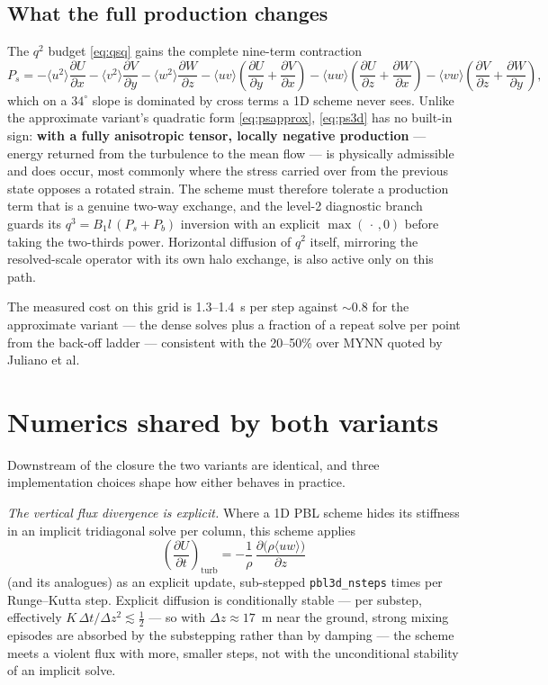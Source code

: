 \documentclass[10pt,a4paper]{article}
\newcommand{\keytag}[1]{\colorbox{keyc}{\textcolor{white}{\sffamily\bfseries\scriptsize K#1}}}
\newcommand{\key}[1]{\marginpar[\raggedleft\keytag{#1}]{\raggedright\keytag{#1}}\ignorespaces}
\newcommand{\kh}[1]{{\color{keyc!80!black}\bfseries #1}}
\newcommand{\avg}[1]{\langle #1 \rangle}
\newcommand{\pd}[2]{\frac{\partial #1}{\partial #2}}
\begin{document}
\subsection{What the full production changes}

The $q^2$ budget \eqref{eq:qsq} gains the complete nine-term contraction
\begin{equation}
P_s = -\avg{u^2}\pd{U}{x} - \avg{v^2}\pd{V}{y} - \avg{w^2}\pd{W}{z}
      - \avg{uv}\!\left(\pd{U}{y}{+}\pd{V}{x}\right)
      - \avg{uw}\!\left(\pd{U}{z}{+}\pd{W}{x}\right)
      - \avg{vw}\!\left(\pd{V}{z}{+}\pd{W}{y}\right),
\label{eq:ps3d}
\end{equation}
which on a $34^\circ$ slope is dominated by cross terms a 1D scheme never sees. \key{6}Unlike the approximate variant's quadratic form \eqref{eq:psapprox}, \eqref{eq:ps3d} has no built-in sign: \kh{with a fully anisotropic tensor, locally negative production} — energy returned from the turbulence to the mean flow — is physically admissible and does occur, most commonly where the stress carried over from the previous state opposes a rotated strain. The scheme must therefore tolerate a production term that is a genuine two-way exchange, and the level-2 diagnostic branch guards its $q^3 = B_1 l\,(P_s + P_b)$ inversion with an explicit $\max(\,\cdot\,,0)$ before taking the two-thirds power. Horizontal diffusion of $q^2$ itself, mirroring the resolved-scale operator with its own halo exchange, is also active only on this path.

The measured cost on this grid is 1.3--1.4~s per step against $\sim$0.8 for the approximate variant — the dense solves plus a fraction of a repeat solve per point from the back-off ladder — consistent with the 20--50\% over MYNN quoted by Juliano et al.

\section{Numerics shared by both variants}
\label{sec:numerics}

Downstream of the closure the two variants are identical, and three implementation choices shape how either behaves in practice.

\emph{The vertical flux divergence is explicit.} Where a 1D PBL scheme hides its stiffness in an implicit tridiagonal solve per column, this scheme applies
\begin{equation}
\left(\pd{U}{t}\right)_{\!\mathrm{turb}} = -\frac{1}{\rho}\,\pd{\big(\rho \avg{uw}\big)}{z}
\end{equation}
(and its analogues) as an explicit update, sub-stepped \texttt{pbl3d\_nsteps} times per Runge--Kutta step. Explicit diffusion is conditionally stable — per substep, effectively $K\,\Delta t/\Delta z^2 \lesssim \tfrac12$ — so with $\Delta z \approx 17$~m near the ground, strong mixing episodes are absorbed by the substepping rather than by damping — the scheme meets a violent flux with more, smaller steps, not with the unconditional stability of an implicit solve.
\end{document}
